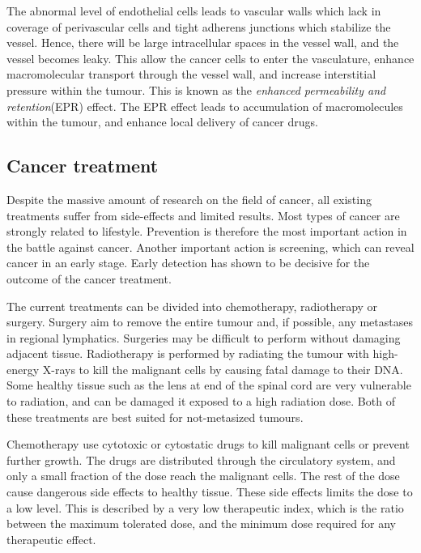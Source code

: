 The abnormal level of endothelial cells leads to vascular walls which lack in coverage of perivascular cells and tight adherens junctions which stabilize the vessel. Hence, there will be large intracellular spaces in the vessel wall, and the vessel becomes leaky. This allow the cancer cells to enter the vasculature, enhance macromolecular transport through the vessel wall, and increase interstitial pressure within the tumour. This is known as the \textit{enhanced permeability and retention}(EPR) effect. The EPR effect leads to accumulation of macromolecules within the tumour, and enhance local delivery of cancer drugs.



\subsection{Cancer treatment}
Despite the massive amount of research on the field of cancer, all existing treatments suffer from side-effects and limited results. Most types of cancer are strongly related to lifestyle. Prevention is therefore the most important action in the battle against cancer. Another important action is screening, which can reveal cancer in an early stage. Early detection has shown to be decisive for the outcome of the cancer treatment\cite{king2006cancer}\cite{Jordan1986}.

The current treatments can be divided into chemotherapy, radiotherapy or surgery. Surgery aim to remove the entire tumour and, if possible, any metastases in regional lymphatics. Surgeries may be difficult to perform without damaging adjacent tissue. Radiotherapy is performed by radiating the tumour with high-energy X-rays to kill the malignant cells by causing fatal damage to their DNA. Some healthy tissue such as the lens at end of the spinal cord are very vulnerable to radiation, and can be damaged it exposed to a high radiation dose. Both of these treatments are best suited for not-metasized tumours.

Chemotherapy use cytotoxic or cytostatic drugs to kill malignant cells or prevent further growth. The drugs are distributed through the circulatory system, and only a small fraction of the dose reach the malignant cells. The rest of the dose cause dangerous side effects to healthy tissue\cite{doi:10.1056/NEJM200106283442607}. These side effects limits the dose to a low level. This is described by a very low therapeutic index, which is the ratio between the maximum tolerated dose, and the minimum dose required for any therapeutic effect.
 
